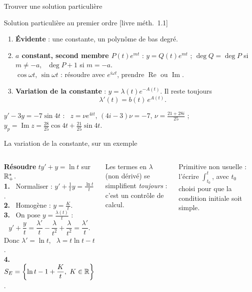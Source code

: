 \documentclass[aspectratio=169,10pt]{beamer}
\DeclareRobustCommand{\livre}[1]{{\sffamily\scriptsize\color{Gris}[livre #1]}}
\newcommand{\etape}[1]{{\sffamily\bfseries\footnotesize\color{Vert}#1}\ }
\begin{document}
\begin{frame}{Trouver une solution particulière}
\begin{METH}{Solution particulière au premier ordre \livre{méth.~1.1}}
\begin{enumerate}
\item \textbf{Évidente} : une constante, un polynôme de bas degré.
\item \textbf{$a$ constant, second membre $P(t)e^{mt}$} : $y=Q(t)e^{mt}$ ; $\deg Q=\deg P$ si $m\neq-a$, \ $\deg P+1$ si $m=-a$.\\
$\cos\omega t$, $\sin\omega t$ : résoudre avec $e^{i\omega t}$, prendre $\operatorname{Re}$ ou $\operatorname{Im}$.
\item \textbf{Variation de la constante} : $y=\lambda(t)e^{-A(t)}$. Il reste toujours
\[\lambda'(t)=b(t)\,e^{A(t)}.\]
\end{enumerate}
\end{METH}
\pause
\begin{EX}
$y'-3y=-7\sin4t$ : \ $z=\nu e^{4it}$, $(4i-3)\nu=-7$, $\nu=\frac{21+28i}{25}$ ;\quad
$y_p=\operatorname{Im}z=\frac{28}{25}\cos4t+\frac{21}{25}\sin4t$.
\end{EX}
\end{frame}

\begin{frame}{La variation de la constante, sur un exemple}
\begin{columns}[T]
\textbf{Résoudre} $ty'+y=\ln t$ sur $\mathbb{R}_+^*$.\\[4pt]
\etape{1.} Normaliser : $y'+\frac1ty=\frac{\ln t}t$.\\[2pt]
\etape{2.} Homogène : $y=\frac Kt$.\\[2pt]
\pause
\etape{3.} On pose $y=\frac{\lambda(t)}t$ :
\[y'+\frac yt=\frac{\lambda'}t-\frac\lambda{t^2}+\frac\lambda{t^2}=\frac{\lambda'}t.\]
Donc $\lambda'=\ln t$, \ $\lambda=t\ln t-t$.\\[2pt]
\pause
\etape{4.} $S_E=\left\{\ln t-1+\dfrac Kt,\ K\in\R\right\}$.
\begin{RETENIR}
Les termes en $\lambda$ (non dérivé) se simplifient \emph{toujours} : c'est un contrôle de calcul.
\end{RETENIR}
\begin{ASTU}
Primitive non usuelle : l'écrire $\int_{t_0}^t$, avec $t_0$ choisi pour que la condition initiale soit simple.
\end{ASTU}
\end{columns}
\end{frame}
\end{document}
